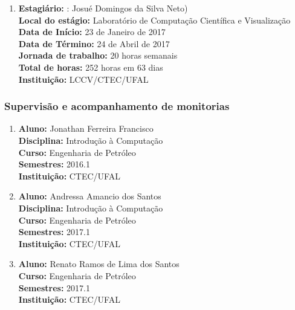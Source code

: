 \documentclass[a4paper,oneside,10pt]{article}
\begin{document}
\begin{enumerate}
\renewcommand{\labelenumi}{{\large\bfseries\arabic{enumi}.}}

\item   \textbf{Estagiário:} : Josué Domingos da Silva Neto) \mbox{} \\
            \textbf{Local do estágio:} Laboratório de Computação Científica e Visualização \\
            \textbf{Data de Início:} 23 de Janeiro de 2017 \\
            \textbf{Data de Término:} 24 de Abril de 2017 \\
            \textbf{Jornada de trabalho:} 20 horas semanais \\
            \textbf{Total de horas:} 252 horas em 63 dias \\
            \textbf{Instituição:} LCCV/CTEC/UFAL

\end{enumerate}


\subsubsection{Supervisão e acompanhamento de monitorias}
\vspace{0.3cm}

\begin{enumerate}
\renewcommand{\labelenumi}{{\large\bfseries\arabic{enumi}.}}

\item       \textbf{Aluno:} Jonathan Ferreira Francisco \mbox{}\\
                \textbf{Disciplina:}  Introdução à Computação\\
                \textbf{Curso:} Engenharia de Petróleo\\
                \textbf{Semestres:} 2016.1\\
                \textbf{Instituição:} CTEC/UFAL

\item       \textbf{Aluno:} Andressa Amancio dos Santos \mbox{}\\
               \textbf{Disciplina:}  Introdução à Computação\\
               \textbf{Curso:} Engenharia de Petróleo\\
               \textbf{Semestres:} 2017.1\\
               \textbf{Instituição:} CTEC/UFAL
            
\item       \textbf{Aluno:} Renato Ramos de Lima dos Santos \mbox{}\\
               \textbf{Curso:} Engenharia de Petróleo\\
               \textbf{Semestres:} 2017.1\\
               \textbf{Instituição:} CTEC/UFAL
\end{enumerate}
\end{document}
